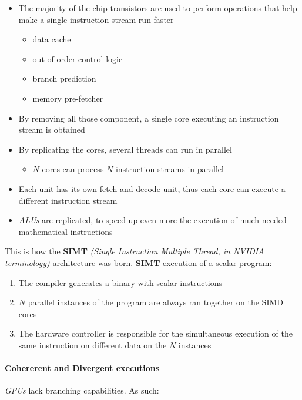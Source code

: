 \documentclass[english]{article}
\begin{document}
\begin{itemize}
  \item The majority of the chip transistors are used to perform operations that help make a single instruction stream run faster
        \begin{itemize}
          \item data cache
          \item out-of-order control logic
          \item branch prediction
          \item memory pre-fetcher
        \end{itemize}
  \item By removing all those component, a single core executing an instruction stream is obtained
  \item By replicating the cores, several threads can run in parallel
        \begin{itemize}
          \item \(N\) cores can process \(N\) instruction streams in parallel
        \end{itemize}
  \item Each unit has its own fetch and decode unit, thus each core can execute a different instruction stream
  \item \textit{ALUs} are replicated, to speed up even more the execution of much needed mathematical instructions
\end{itemize}

This is how the \textbf{SIMT} \textit{(Single Instruction Multiple Thread, in NVIDIA terminology)} architecture was born.
\textbf{SIMT} execution of a scalar program:

\begin{enumerate}
  \item The compiler generates a binary with scalar instructions
  \item \(N\) parallel instances of the program are always ran together on the SIMD cores
  \item The hardware controller is responsible for the simultaneous execution of the same instruction on different data on the \(N\) instances
\end{enumerate}

\paragraph{Cohererent and Divergent executions}

\textit{GPUs} lack branching capabilities. As such:
\end{document}
